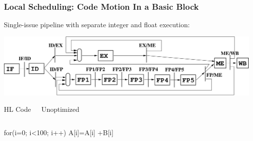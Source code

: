 \documentclass[rgb,dvipsnames]{beamer}
\newcommand{\emp}[1]{\textcolor{DikuRed}{ #1}}
\begin{document}
\begin{frame}[fragile,t]
    \frametitle{Local Scheduling: Code Motion In a Basic Block}

Single-issue pipeline with separate integer and float execution:\bigskip

\includegraphics[width=53ex]{figures/SimpleOoOPipeline}
\bigskip


\begin{block}{HL Code{\tt~~~}Unoptimized}
\begin{columns}
\begin{colorcode}[fontsize=\scriptsize]
for(i=0;
    i<100; 
    i++)
  A[i]=A[i]
      +B[i]
\end{colorcode} 
\begin{colorcode}[fontsize=\scriptsize]

\end{colorcode} 
\end{columns}
\end{block}
\end{frame}
\end{document}

